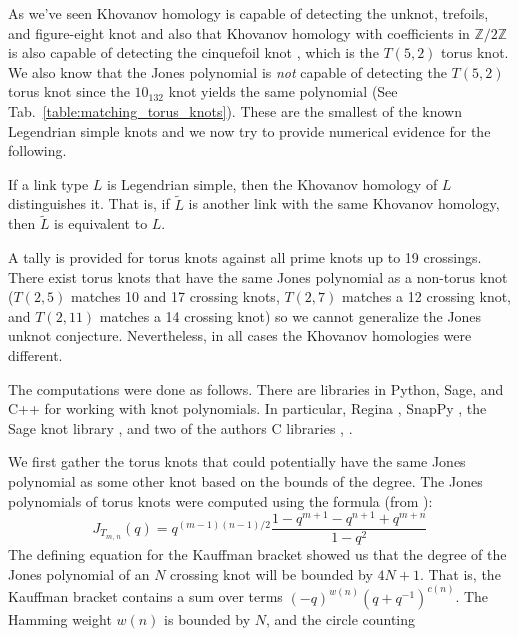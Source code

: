 As we've seen Khovanov homology is capable of detecting the
unknot, trefoils, and figure-eight knot and also that Khovanov homology with
coefficients in $\mathbb{Z}/2\mathbb{Z}$ is also capable of detecting
the cinquefoil knot \cite{BaldwinYingSivekCinquefoilKhovanov},
which is the $T(5,2)$ torus knot. We also know that the Jones
polynomial is \textit{not} capable of detecting the
$T(5,2)$ torus knot since the $10_{132}$ knot yields the same
polynomial (See Tab.~\ref{table:matching_torus_knots}).
These are the smallest of the known Legendrian simple knots
and we now try to provide numerical evidence for the following.
\begin{conjecture}
    If a link type $L$ is Legendrian simple, then the Khovanov homology
    of $L$ distinguishes it. That is, if $\tilde{L}$
    is another link with the same Khovanov homology, then $\tilde{L}$ is
    equivalent to $L$.
\end{conjecture}
A tally is provided for torus knots against all prime knots up to 19 crossings.
There exist torus knots that have the same Jones polynomial as a non-torus
knot ($T(2,5)$ matches 10 and 17 crossing knots, $T(2,7)$
matches a 12 crossing knot, and $T(2,11)$ matches a 14 crossing knot)
so we cannot generalize the Jones unknot conjecture. Nevertheless, in
all cases the Khovanov homologies were different.
\par\hfill\par
The computations were done as follows. There are libraries in Python,
Sage, and C++ for working with knot polynomials. In particular,
Regina \cite{regina}, SnapPy \cite{SnapPy}, the Sage knot library
\cite{sage}, and two of the authors C libraries
\cite{MaguireJones}, \cite{MaguireLibtmpl}.
\par\hfill\par
We first gather the torus knots that could potentially have the same
Jones polynomial as some other knot based on the bounds of the degree.
The Jones polynomials of torus knots were computed using the
formula (from \cite{jonesfordummyvjones}):
\begin{equation}
    \label{eqn:jones_poly_torus}%
    J_{T_{m,\,n}}(q)=q^{(m-1)(n-1)/2}
        \frac{1-q^{m+1}-q^{n+1}+q^{m+n}}{1-q^{2}}
\end{equation}
The defining equation for the Kauffman bracket showed us that the degree of the
Jones polynomial of an $N$ crossing knot will be bounded by $4N+1$. That is,
the Kauffman bracket contains a sum over terms $(-q)^{w(n)}(q+q^{-1})^{c(n)}$.
The Hamming weight $w(n)$ is bounded by $N$, and the circle counting
